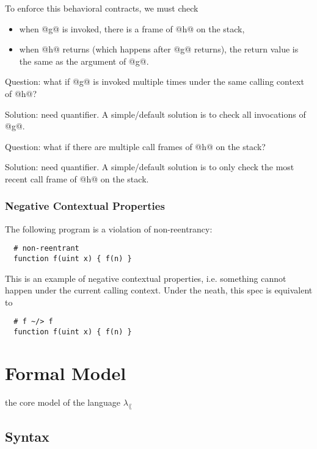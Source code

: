 \documentclass[acmsmall,review,anonymous]{acmart}\settopmatter{printfolios=true,printccs=false,printacmref=false}
\begin{document}
To enforce this behavioral contracts, we must check
\begin{itemize}
	\item when @g@ is invoked, there is a frame of @h@ on the stack,
	\item when @h@ returns (which happens after @g@ returns), the return value
	      is the same as the argument of @g@.
\end{itemize}

Question: what if @g@ is invoked multiple times under the same calling context of
@h@?

Solution: need quantifier. A simple/default solution is to check all
invocations of @g@.

Question: what if there are multiple call frames of @h@ on the stack?

Solution: need quantifier. A simple/default solution is to only check
the most recent call frame of @h@ on the stack.

\subsubsection{Negative Contextual Properties}

The following program is a violation of non-reentrancy:

\begin{lstlisting}
  # non-reentrant
  function f(uint x) { f(n) }
\end{lstlisting}

This is an example of negative contextual properties, i.e. something cannot
happen under the current calling context. Under the neath, this spec is
equivalent to

\begin{lstlisting}
  # f ~/> f
  function f(uint x) { f(n) }
\end{lstlisting}

\section{Formal Model}

the core model of the language $\lambda_\lang$

\subsection{Syntax}


\end{document}
